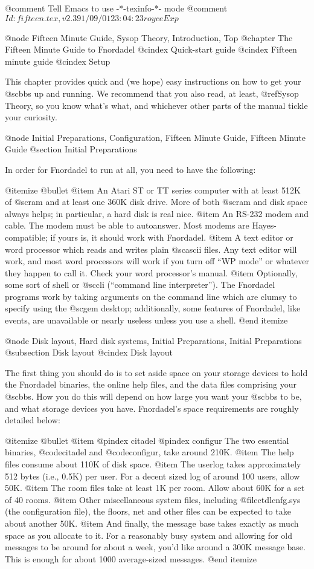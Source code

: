 @comment Tell Emacs to use -*-texinfo-*- mode
@comment $Id: fifteen.tex,v 2.3 91/09/01 23:04:23 royce Exp $

@node Fifteen Minute Guide, Sysop Theory, Introduction, Top
@chapter The Fifteen Minute Guide to Fnordadel
@cindex Quick-start guide
@cindex Fifteen minute guide
@cindex Setup

This chapter provides quick and (we hope) easy instructions on how to get
your @sc{bbs} up and running.  We recommend that you also read, at least,
@ref{Sysop Theory}, so you know what's what, and whichever other
parts of the manual tickle your curiosity.

@node Initial Preparations, Configuration, Fifteen Minute Guide, Fifteen Minute Guide
@section Initial Preparations

In order for Fnordadel to run at all, you need to have the following:

@itemize @bullet
@item
An Atari ST or TT series computer with at least 512K of @sc{ram} and at least
one 360K disk drive.  More of both @sc{ram} and disk space always helps; in
particular, a hard disk is real nice.
@item
An RS-232 modem and cable.  The modem must be able to autoanswer.  Most
modems are Hayes-compatible; if yours is, it should work with Fnordadel.
@item
A text editor or word processor which reads and writes plain @sc{ascii}
files.  Any text editor will work, and most word processors will work if you
turn off ``WP mode'' or whatever they happen to call it.  Check your word
processor's manual.
@item
Optionally, some sort of shell or @sc{cli} (``command line interpreter'').  The
Fnordadel programs work by taking arguments on the command line which are
clumsy to specify using the @sc{gem} desktop; additionally, some features
of Fnordadel, like events, are unavailable or nearly useless unless you
use a shell.
@end itemize

@node Disk layout, Hard disk systems, Initial Preparations, Initial Preparations
@subsection Disk layout
@cindex Disk layout

The first thing you should do is to
set aside space on your storage devices to hold the Fnordadel binaries, the
online help files, and the data files comprising your @sc{bbs}.
How you do this will depend on how large you want your @sc{bbs} to be, and what
storage devices you have.  Fnordadel's space requirements are roughly
detailed below:

@itemize @bullet
@item
@pindex citadel
@pindex configur
The two essential binaries, @code{citadel} and @code{configur}, take around
210K.
@item
The help files consume about 110K of disk space.
@item
The userlog takes approximately 512 bytes (i.e., 0.5K) per user.  For a decent
sized log of around 100 users, allow 50K.
@item
The room files take at least 1K per room.  Allow about 60K for a set of 40
rooms.
@item
Other miscellaneous system files, including @file{ctdlcnfg.sys} (the
configuration file), the floors, net and other files can be expected to take
about another 50K.
@item
And finally, the message base takes exactly as much space as you allocate to
it.  For a reasonably busy system and allowing for old messages to be around
for about a week, you'd like around a 300K message base.  This is enough for
about 1000 average-sized messages.
@end itemize

